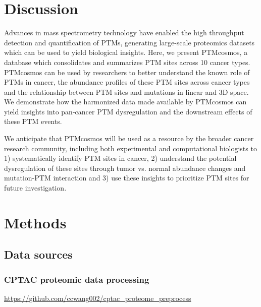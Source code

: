 \section{Discussion}
Advances in mass spectrometry technology have enabled the high throughput detection and quantification of PTMs, generating large-scale proteomics datasets which can be used to yield biological insights. Here, we present PTMcosmos, a database which consolidates and summarizes PTM sites across 10 cancer types. PTMcosmos can be used by researchers to better understand the known role of PTMs in cancer, the abundance profiles of these PTM sites across cancer types and the relationship between PTM sites and mutations in linear and 3D space. We demonstrate how the harmonized data made available by PTMcosmos can yield insights into pan-cancer PTM dysregulation and the downstream effects of these PTM events.

We anticipate that PTMcosmos will be used as a resource by the broader cancer research community, including both experimental and computational biologists to 1) systematically identify PTM sites in cancer, 2) understand the potential dysregulation of these sites through tumor vs. normal abundance changes and mutation-PTM interaction and 3) use these insights to prioritize PTM sites for future investigation.



\section{Methods}

\subsection{Data sources}
\subsubsection{CPTAC proteomic data processing}

 \url{https://github.com/ccwang002/cptac_proteome_preprocess}


